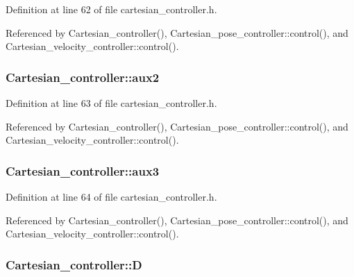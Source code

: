 Definition at line 62 of file cartesian\-\_\-controller.\-h.



Referenced by Cartesian\-\_\-controller(), Cartesian\-\_\-pose\-\_\-controller\-::control(), and Cartesian\-\_\-velocity\-\_\-controller\-::control().

\hypertarget{classCartesian__controller_af73a0c910cd80ed2f84974b65beba450}{
\subsubsection[{aux2}]{ Cartesian\-\_\-controller\-::aux2\hspace{0.3cm}{\ttfamily [protected]}}}\label{classCartesian__controller_af73a0c910cd80ed2f84974b65beba450}


Definition at line 63 of file cartesian\-\_\-controller.\-h.



Referenced by Cartesian\-\_\-controller(), Cartesian\-\_\-pose\-\_\-controller\-::control(), and Cartesian\-\_\-velocity\-\_\-controller\-::control().

\hypertarget{classCartesian__controller_aa37c15fcd53a60ecce106cd9b39d3501}{
\subsubsection[{aux3}]{ Cartesian\-\_\-controller\-::aux3\hspace{0.3cm}{\ttfamily [protected]}}}\label{classCartesian__controller_aa37c15fcd53a60ecce106cd9b39d3501}


Definition at line 64 of file cartesian\-\_\-controller.\-h.



Referenced by Cartesian\-\_\-controller(), Cartesian\-\_\-pose\-\_\-controller\-::control(), and Cartesian\-\_\-velocity\-\_\-controller\-::control().

\hypertarget{classCartesian__controller_a8c470b652ce436d8e48f126073fc2593}{
\subsubsection[{D}]{ Cartesian\-\_\-controller\-::\-D\hspace{0.3cm}{\ttfamily [protected]}}}\label{classCartesian__controller_a8c470b652ce436d8e48f126073fc2593}


